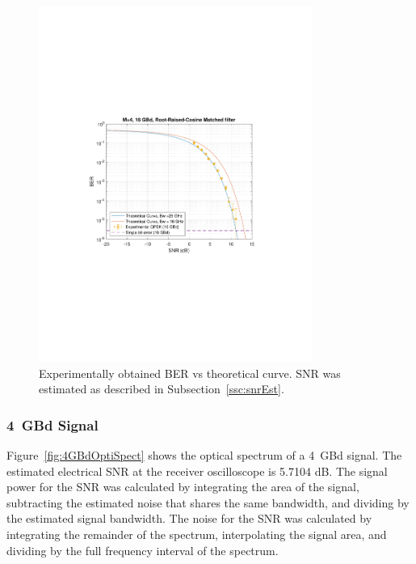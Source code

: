 \begin{refsection}
\begin{figure}[H]
	\centering
	\includegraphics[clip, trim=4cm 8cm 4cm 8cm,
	width=0.8\textwidth]{./sdf/m_qam_system/figures/expResults/16GBdBER20180611.pdf}
	\caption{Experimentally obtained BER vs theoretical curve. SNR was estimated as described in Subsection~\ref{ssc:snrEst}.}
	\label{fig:16GBdFinal}
\end{figure}



\subsubsection{4~GBd Signal}
%
Figure~\ref{fig:4GBdOptiSpect} shows the optical spectrum of a 4~GBd signal. The estimated electrical SNR at the receiver oscilloscope is 5.7104 dB. The signal power for the SNR was calculated by integrating the area of the signal, subtracting the estimated noise that shares the same bandwidth, and dividing by the estimated signal bandwidth. The noise for the SNR was calculated by integrating the remainder of the spectrum, interpolating the signal area, and dividing by the full frequency interval of the spectrum.


\end{refsection}
